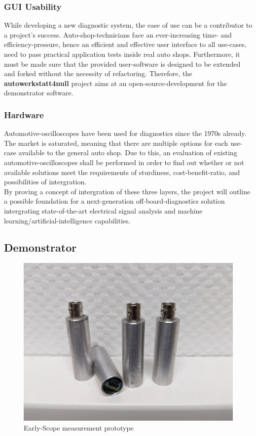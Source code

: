 \subsubsection{GUI Usability}
While developing a new diagnostic system, the ease of use can be a contributor to a project's success.
Auto-shop-technicians face an ever-increasing time- and efficiency-pressure, hence an efficient and effective user interface to all use-cases, need to pass practical application tests inside real auto shops.
Furthermore, it must be made sure that the provided user-software is designed to be extended and forked without the necessity of refactoring.
Therefore, the \textbf{autowerkstatt4null} project aims at an open-source-development for the demonstrator software.

\subsubsection{Hardware}
Automotive-oscilloscopes have been used for diagnostics since the 1970s already.
The market is saturated, meaning that there are multiple options for each use-case available to the general auto shop.
Due to this, an evaluation of existing automotive-oscilloscopes shall be performed in order to find out whether or not available solutions meet the requirements of sturdiness, cost-benefit-ratio, and possibilities of intergration. \\

By proving a concept of intergration of these three layers, the project will outline a possible foundation for a next-generation off-board-diagnostics solution intergrating state-of-the-art electrical signal analysis and machine learning/artificial-intelligence capabilities.


\subsection{Demonstrator}
\begin{figure}[ht]
  \centering
  \includegraphics[width=0.9\linewidth]{figures/early_prototype.jpg}
  \caption{Early-Scope measurement prototype}
  \label{fig:early-scope}
\end{figure}

